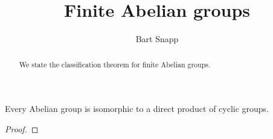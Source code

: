 \documentclass{ximera}
\author{Bart Snapp}
\title{Finite Abelian groups}
\begin{document}
\begin{abstract}
  We state the classification theorem for finite Abelian groups.
\end{abstract}
\maketitle

\begin{theorem}
  Every Abelian group is isomorphic to a direct product of cyclic groups.
  \begin{proof}
  \end{proof}
\end{theorem}
\end{document}
